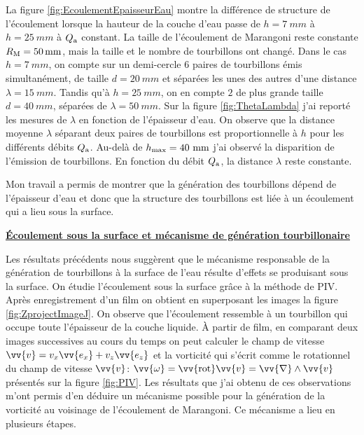 \documentclass[french, 10pt]{article}
\begin{document}
La figure \ref{fig:EcoulementEpaisseurEau} montre la différence de structure de l'écoulement lorsque la hauteur de la couche d'eau passe de $h=\SI{7}{mm}$ à $h=\SI{25}{mm}$ à $Q_{\rm a}$ constant. La taille de l'écoulement de Marangoni reste constante $R_{\rm M} = \SI{50}{mm}$, mais la taille et le nombre de tourbillons ont changé. Dans le cas $h=\SI{7}{mm}$, on compte sur un demi-cercle $6$ paires de tourbillons émis simultanément, de taille $d=\SI{20}{mm}$ et séparées les unes des autres d'une distance $\lambda = \SI{15}{mm}$. Tandis qu'à $h=\SI{25}{mm}$, on en compte $2$ de plus grande taille $d=\SI{40}{mm}$, séparées de $\lambda = \SI{50}{mm}$. Sur la figure \ref{fig:ThetaLambda} j'ai reporté les mesures de $\lambda$ en fonction de l'épaisseur d'eau. On observe que la distance moyenne $\lambda$ séparant deux paires de tourbillons est proportionnelle à $h$ pour les différents débits  $Q_{\rm a}$. Au-delà de $h_{\rm max} = 40~\rm mm$ j'ai observé la disparition de l'émission de tourbillons. En fonction du débit $Q_{\rm a}$, la distance  $\lambda$ reste constante.\medskip

 Mon travail a permis de montrer que la génération des tourbillons dépend de l'épaisseur d'eau  et donc que la structure des tourbillons est liée à un écoulement qui a lieu sous la surface.\medskip


\noindent\underline{\textbf{Écoulement sous la surface et mécanisme de génération tourbillonaire}}\medskip

Les résultats précédents nous suggèrent que le mécanisme responsable de la génération de tourbillons à la surface de l'eau résulte d'effets se produisant sous la surface. On étudie l'écoulement sous la surface grâce à la méthode de PIV. Après enregistrement d'un film on obtient en superposant les images la figure \ref{fig:ZprojectImageJ}. On observe que l'écoulement ressemble à un tourbillon qui occupe toute l'épaisseur de la couche liquide. À partir de film, en comparant deux images successives au cours du temps on peut calculer le champ de vitesse $\vv{v} = v_{x}\vv{e_{x}}+v_{z}\vv{e_z} \label{eq:ChampVitesse}$ et la vorticité qui s'écrit comme le rotationnel du champ de vitesse $\vv{v}$: $\vv{\omega}= \vv{\text{rot}}\vv{v}=\vv{\nabla}\wedge\vv{v} \label{eq:VecteurTourbillon}$ présentés sur la figure \ref{fig:PIV}. Les résultats que j'ai obtenu de ces observations m'ont permis d'en déduire un mécanisme possible pour la génération de la vorticité au voisinage de l'écoulement de Marangoni. Ce mécanisme a lieu en plusieurs étapes.\medskip
\end{document}
